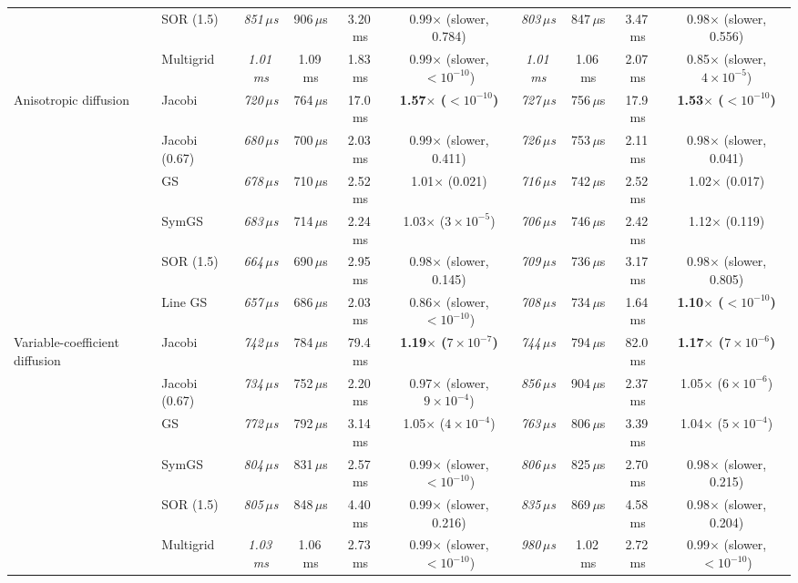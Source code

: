 {\begin{tabular}{llcccccccc}
 & SOR (1.5) & \textit{851\,$\mu$s} & 906\,$\mu$s & 3.20\,ms & 0.99$\times$ (slower, 0.784) & \textit{803\,$\mu$s} & 847\,$\mu$s & 3.47\,ms & 0.98$\times$ (slower, 0.556) \\
 & Multigrid & \textit{1.01\,ms} & 1.09\,ms & 1.83\,ms & 0.99$\times$ (slower, $<10^{-10}$) & \textit{1.01\,ms} & 1.06\,ms & 2.07\,ms & 0.85$\times$ (slower, $4\times10^{-5}$) \\
\midrule
Anisotropic diffusion & Jacobi & \textit{720\,$\mu$s} & 764\,$\mu$s & 17.0\,ms & \textbf{1.57$\times$ ($<10^{-10}$)} & \textit{727\,$\mu$s} & 756\,$\mu$s & 17.9\,ms & \textbf{1.53$\times$ ($<10^{-10}$)} \\
 & Jacobi (0.67) & \textit{680\,$\mu$s} & 700\,$\mu$s & 2.03\,ms & 0.99$\times$ (slower, 0.411) & \textit{726\,$\mu$s} & 753\,$\mu$s & 2.11\,ms & 0.98$\times$ (slower, 0.041) \\
 & GS & \textit{678\,$\mu$s} & 710\,$\mu$s & 2.52\,ms & 1.01$\times$ (0.021) & \textit{716\,$\mu$s} & 742\,$\mu$s & 2.52\,ms & 1.02$\times$ (0.017) \\
 & SymGS & \textit{683\,$\mu$s} & 714\,$\mu$s & 2.24\,ms & 1.03$\times$ ($3\times10^{-5}$) & \textit{706\,$\mu$s} & 746\,$\mu$s & 2.42\,ms & 1.12$\times$ (0.119) \\
 & SOR (1.5) & \textit{664\,$\mu$s} & 690\,$\mu$s & 2.95\,ms & 0.98$\times$ (slower, 0.145) & \textit{709\,$\mu$s} & 736\,$\mu$s & 3.17\,ms & 0.98$\times$ (slower, 0.805) \\
 & Line GS & \textit{657\,$\mu$s} & 686\,$\mu$s & 2.03\,ms & 0.86$\times$ (slower, $<10^{-10}$) & \textit{708\,$\mu$s} & 734\,$\mu$s & 1.64\,ms & \textbf{1.10$\times$ ($<10^{-10}$)} \\
\midrule
Variable-coefficient diffusion & Jacobi & \textit{742\,$\mu$s} & 784\,$\mu$s & 79.4\,ms & \textbf{1.19$\times$ ($7\times10^{-7}$)} & \textit{744\,$\mu$s} & 794\,$\mu$s & 82.0\,ms & \textbf{1.17$\times$ ($7\times10^{-6}$)} \\
 & Jacobi (0.67) & \textit{734\,$\mu$s} & 752\,$\mu$s & 2.20\,ms & 0.97$\times$ (slower, $9\times10^{-4}$) & \textit{856\,$\mu$s} & 904\,$\mu$s & 2.37\,ms & 1.05$\times$ ($6\times10^{-6}$) \\
 & GS & \textit{772\,$\mu$s} & 792\,$\mu$s & 3.14\,ms & 1.05$\times$ ($4\times10^{-4}$) & \textit{763\,$\mu$s} & 806\,$\mu$s & 3.39\,ms & 1.04$\times$ ($5\times10^{-4}$) \\
 & SymGS & \textit{804\,$\mu$s} & 831\,$\mu$s & 2.57\,ms & 0.99$\times$ (slower, $<10^{-10}$) & \textit{806\,$\mu$s} & 825\,$\mu$s & 2.70\,ms & 0.98$\times$ (slower, 0.215) \\
 & SOR (1.5) & \textit{805\,$\mu$s} & 848\,$\mu$s & 4.40\,ms & 0.99$\times$ (slower, 0.216) & \textit{835\,$\mu$s} & 869\,$\mu$s & 4.58\,ms & 0.98$\times$ (slower, 0.204) \\
 & Multigrid & \textit{1.03\,ms} & 1.06\,ms & 2.73\,ms & 0.99$\times$ (slower, $<10^{-10}$) & \textit{980\,$\mu$s} & 1.02\,ms & 2.72\,ms & 0.99$\times$ (slower, $<10^{-10}$) \\
\bottomrule
\end{tabular}}
